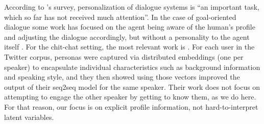 \documentclass[11pt,a4paper]{article}
\begin{document}
According to 's survey, personalization of dialogue systems is ``an
important task, which so far has not received much attention''. In the case of goal-oriented dialogue some work has focused
on the agent being aware of the human's profile and adjusting the dialogue accordingly, but without a personality to the agent itself
 \citep{lucas2009managing,joshi2017personalization}.
For the chit-chat setting, the most relevant work is \citep{li2016persona}.
For each user in the Twitter corpus, personas were captured via distributed embeddings (one per speaker) to encapsulate individual characteristics such as background information and speaking style,
and they then showed using those vectors improved the output of their seq2seq model for the same speaker. 
Their work does not focus on attempting to engage the other speaker by getting to know them, as we do here. For that reason,
our focus is on explicit profile information, not hard-to-interpret latent variables. 
\end{document}
